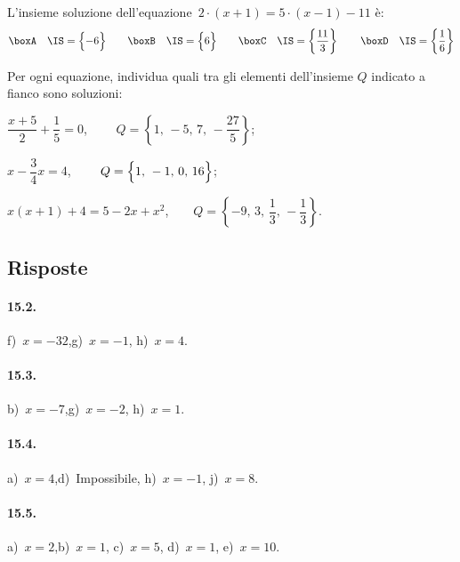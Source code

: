 \begin{esercizio}
\label{ese:15.49}
L'insieme soluzione dell'equazione~$2\cdot \left(x+1\right)=5\cdot \left(x-1\right)-11$ è:
\[\boxA\quad \IS=\Bigl\{-6\Bigr\}\qquad\boxB\quad \IS=\Bigl\{6\Bigr\}\qquad\boxC\quad \IS=\left\{\dfrac{11}{3}\right\}\qquad\boxD\quad \IS=\left\{\dfrac{1}{6}\right\}\]
\end{esercizio}

\begin{esercizio}
\label{ese:15.50}
Per ogni equazione, individua quali tra gli elementi dell'insieme $Q$ indicato a fianco sono soluzioni:
\begin{enumeratea}
\spazielenx
 \item $\dfrac{x+5}{2}+\dfrac{1}{5}=0$, $\qquad Q=\left\{1\text{,~}-5\text{,~}7\text{,~}-\dfrac{27}{5}\right\}$;
 \item $x-\dfrac{3}{4}x=4$, $\qquad Q=\Bigl\{1\text{,~}-1\text{,~}0\text{,~}16\Bigr\}$;
 \item $x(x+1)+4=5-2x+x^{2}$,$\qquad Q=\left\{-9\text{,~}3\text{,~}\dfrac{1}{3}\text{,~}-\dfrac{1}{3}\right\}$.
\end{enumeratea}
\end{esercizio}

\pagebreak

\subsection{Risposte}

\paragraph{15.2.}
f)~$x=-32$,\quad g)~$x=-1$, \quad h)~$x=4$.

\paragraph{15.3.}
b)~$x=-7$,\quad g)~$x=-2$, \quad h)~$x=1$.

\paragraph{15.4.}
a)~$x=4$,\quad d)~Impossibile, \quad h)~$x=-1$, \quad j)~$x=8$.

\paragraph{15.5.}
a)~$x=2$,\quad b)~$x=1$, \quad c)~$x=5$, \quad d)~$x=1$, \quad e)~$x=10$.

